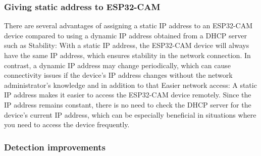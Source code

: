\subsubsection{Giving static address to ESP32-CAM}
There are several advantages of assigning a static IP address to an ESP32-CAM device compared to using a dynamic IP address obtained from a DHCP server such as Stability: With a static IP address, the ESP32-CAM device will always have the same IP address, which ensures stability in the network connection. In contrast, a dynamic IP address may change periodically, which can cause connectivity issues if the device's IP address changes without the network administrator's knowledge
and in addition to that Easier network access: A static IP address makes it easier to access the ESP32-CAM device remotely. Since the IP address remains constant, there is no need to check the DHCP server for the device's current IP address, which can be especially beneficial in situations where you need to access the device frequently.
\subsubsection{Detection improvements}

%




%